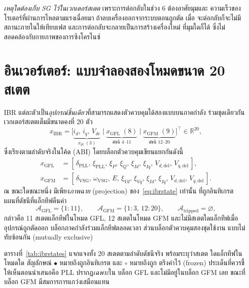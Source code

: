 \documentclass[12pt,a4paper]{article}
\begin{document}
\emph{เหตุใดต้องเก็บ SG ไว้ในเวกเตอร์สเตต} เพราะการต่อกลับในช่วง 6 ต้องอาศัยมุมและ
ความเร็วของโรเตอร์ที่ผ่านการไหลตามแรงเฉื่อยมา ถ้าลบเครื่องออกจากระบบตอนถูกตัด เมื่อ
จะต่อกลับก็จะไม่มีสถานะภายในให้เทียบเฟส และการต่อกลับจะกลายเป็นการสร้างเครื่องใหม่
ที่มุมใดก็ได้ ซึ่งไม่สอดคล้องกับกายภาพของการซิงโครไนซ์

\section{อินเวอร์เตอร์: แบบจำลองสองโหมดขนาด 20 สเตต}\label{sec:ibr}
IBR แต่ละตัวเป็น\emph{อุปกรณ์ชิ้นเดียว}ที่สามารถแสดงตัวควบคุมได้สองแบบบนภาคกำลัง
ร่วมชุดเดียวกัน เวกเตอร์สเตตเต็มมีขนาดคงที่ 20 ตัว
\begin{equation}
  x_{\mathrm{IBR}}
   =\bigl[\underbrace{i_d,\,i_q,\,V_{dc}}_{x_{\mathrm{pl}}\;(3)}\;\big|\;
          \underbrace{x_{\mathrm{GFL}}\;(8)}_{\text{ดัชนี }4\text{--}11}\;\big|\;
          \underbrace{x_{\mathrm{GFM}}\;(9)}_{\text{ดัชนี }12\text{--}20}\bigr]^{\top}
   \in\mathbb{R}^{20},
   \label{eq:ibrstate}
\end{equation}
ซึ่งเรียงตามลำดับจริงในโค้ด (ABI) โดยบล็อกตัวควบคุมเขียนแยกกันดังนี้
\begin{align}
  x_{\mathrm{GFL}}&=[\,\delta_{\mathrm{PLL}},\,\xi_{\mathrm{PLL}},\,\xi_P,\,\xi_Q,
      \,\xi_{Id},\,\xi_{Iq},\,V_{d,\mathrm{del}},\,V_{q,\mathrm{del}}\,],\\
  x_{\mathrm{GFM}}&=[\,\delta_{\mathrm{VSG}},\,\omega_{\mathrm{VSG}},\,E,
      \,\xi_{Vd},\,\xi_{Vq},\,\xi_{Id},\,\xi_{Iq},
      \,V_{d,\mathrm{del}},\,V_{q,\mathrm{del}}\,].
\end{align}
ณ ขณะใดขณะหนึ่ง มีเพียง\emph{ภาพฉาย} (projection) ของ~\eqref{eq:ibrstate} เท่านั้น
ที่ถูกอินทิเกรต แผนที่ดัชนีที่แอ็กทีฟคืนค่า
\begin{equation}
  \mathcal{A}_{\mathrm{GFL}}=\{1{:}11\},\qquad
  \mathcal{A}_{\mathrm{GFM}}=\{1{:}3,\,12{:}20\},\qquad
  \mathcal{A}_{\mathrm{tripped}}=\varnothing,
  \label{eq:ibractive}
\end{equation}
กล่าวคือ 11 สเตตแอ็กทีฟในโหมด GFL, 12 สเตตในโหมด GFM และไม่มีสเตตใดแอ็กทีฟเมื่อ
อุปกรณ์ถูกตัดออก บล็อกภาคกำลังร่วมแอ็กทีฟตลอดเวลา ส่วนบล็อกตัวควบคุมสองชุดใช้งาน
แบบไม่ทับซ้อนกัน (mutually exclusive)

ตารางที่~\ref{tab:ibrstates} แจกแจงทั้ง 20 สเตตตามลำดับดัชนีจริง พร้อมระบุว่าสเตต
ใดแอ็กทีฟในโหมดใด สัญลักษณ์ $\bullet$ หมายถึงถูกอินทิเกรต และ $\circ$ หมายถึงถูก
ตรึงค่าไว้ (frozen) ประเด็นที่ควรชี้ให้เห็นตอนนำเสนอคือ PLL ปรากฏ\emph{เฉพาะ}ใน
บล็อก GFL และไม่มีอยู่ในบล็อก GFM เลย ขณะที่บล็อก GFM มีสมการการแกว่งเสมือนแทน
\end{document}
